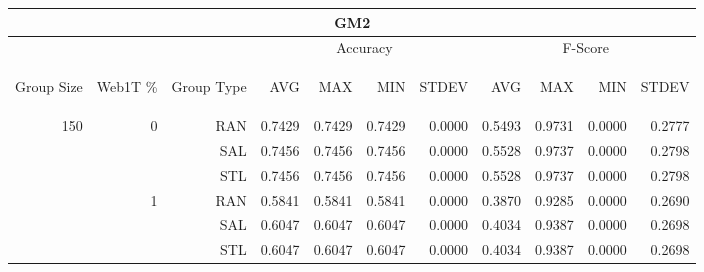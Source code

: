 \begin{center}
\begin{table}[htbp]
\begin{tabular}{ | r | r | r | r | r | r | r | r | r | r | r |}
\hline
\multicolumn{11}{|c|}{GM2}\\
\hline
 & & & \multicolumn{4}{|c|}{Accuracy} & \multicolumn{4}{|c|}{F-Score}\\ \cline{4-11}
\begin{sideways}Group Size\end{sideways} & \begin{sideways}Web1T \%\end{sideways} & \begin{sideways}Group Type\end{sideways} & \begin{sideways}AVG\end{sideways} & \begin{sideways}MAX\end{sideways} & \begin{sideways}MIN\end{sideways} & \begin{sideways}STDEV\end{sideways} & \begin{sideways}AVG\end{sideways} & \begin{sideways}MAX\end{sideways} & \begin{sideways}MIN\end{sideways} & \begin{sideways}STDEV\end{sideways}\\
\hline
\multirow{12}{*}{150}
 & \multirow{3}{*}{0} & RAN & 0.7429 & 0.7429 & 0.7429 & 0.0000 & 0.5493 & 0.9731 & 0.0000 & 0.2777\\ \cline{3-11}
 &   & SAL & 0.7456 & 0.7456 & 0.7456 & 0.0000 & 0.5528 & 0.9737 & 0.0000 & 0.2798\\ \cline{3-11}
 &   & STL & 0.7456 & 0.7456 & 0.7456 & 0.0000 & 0.5528 & 0.9737 & 0.0000 & 0.2798\\ \cline{2-11}
 & \multirow{3}{*}{1} & RAN & 0.5841 & 0.5841 & 0.5841 & 0.0000 & 0.3870 & 0.9285 & 0.0000 & 0.2690\\ \cline{3-11}
 &   & SAL & 0.6047 & 0.6047 & 0.6047 & 0.0000 & 0.4034 & 0.9387 & 0.0000 & 0.2698\\ \cline{3-11}
 &   & STL & 0.6047 & 0.6047 & 0.6047 & 0.0000 & 0.4034 & 0.9387 & 0.0000 & 0.2698\\ \cline{2-11}

\end{tabular}
\end{table}
\end{center}
